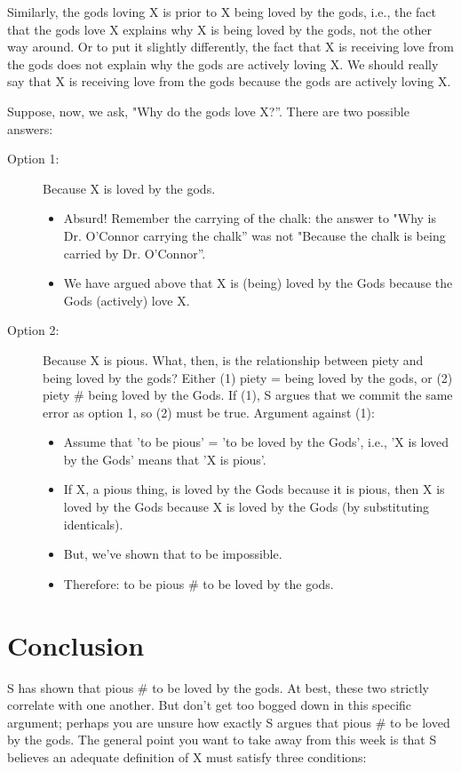 \documentclass[oneside]{article}
\begin{document}
\begin{description}
Similarly, the gods loving X is prior to X being loved by the gods, i.e., the fact that the gods love X explains why X is being loved by the gods, not the other way around. Or to put it slightly differently, the fact that X is receiving love from the gods does not explain why the gods are actively loving X. We should really say that X is receiving love from the gods because the gods are actively loving X. 

Suppose, now, we ask, "Why do the gods love X?''. There are two possible answers:

\begin{description}
\item[Option 1:] Because X is loved by the gods. 
\begin{itemize}
\item Absurd! Remember the carrying of the chalk: the answer to "Why is Dr. O'Connor carrying the chalk'' was not "Because the chalk is being carried by Dr. O'Connor''.
\item We have argued above that X is  (being) loved by the Gods because the Gods (actively) love X.
\end{itemize}
\item[Option 2:] Because X is pious. What, then, is the relationship between piety and being loved by the gods? Either (1) piety = being loved by the gods, or (2) piety \# being loved by the Gods. If (1), S argues that we commit the same error as option 1, so (2) must be true. Argument against (1):
   \begin{itemize}
   \item Assume that 'to be pious' = 'to be loved by the Gods', i.e., 'X is loved by the Gods' means that 'X is pious'.
   \item If X, a pious thing, is loved by the Gods because it is pious, then X is loved by the Gods because X is loved by the Gods (by substituting identicals). 
  \item But, we've shown that to be impossible.
  \item Therefore: to be pious \# to be loved by the gods.
\end{itemize}
\end{description}


\section{Conclusion}

S has shown that pious \# to be loved by the gods. At best, these two strictly correlate with one another. But don't get too bogged down in this specific argument; perhaps you are unsure how exactly S argues that pious \# to be loved by the gods. The general point you want to take away from this week is that S believes an adequate definition of X must satisfy three conditions: 


\end{description}
\end{document}
